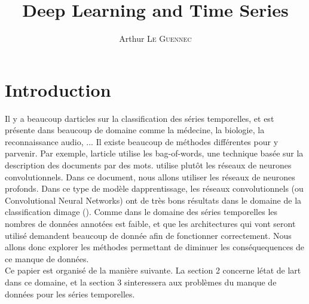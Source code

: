 \documentclass[11pt]{sdm}
\title{Deep Learning and Time Series}
\author{Arthur \textsc{Le Guennec}}
\begin{document}
\maketitle


\section{Introduction}

Il y a beaucoup d\textquotesingle articles sur la classification des s\'eries temporelles, et est pr\'esente dans beaucoup de domaine comme la m\'edecine, la biologie, la reconnaissance audio, ... Il existe beaucoup de m\'ethodes diff\'erentes pour y parvenir. Par exemple, l\textquotesingle article \cite{bailly2015bag} utilise les bag-of-words, une technique bas\'ee sur la description des documents par des mots. \cite{zheng2014time} utilise plut\^ot les r\'eseaux de neurones convolutionnels.
Dans ce document, nous allons utiliser les r\'eseaux de neurones profonds. Dans ce type de mod\`ele d\textquotesingle apprentissage, les r\'eseaux convolutionnels (ou Convolutional Neural Networks) ont de tr\`es bons r\'esultats dans le domaine de la classification d\textquotesingle image (\cite{chatfield2014return}).
Comme dans le domaine des s\'eries temporelles les nombres de donn\'ees annot\'ees est faible, et que les architectures qui vont seront utilis\'e demandent beaucoup de donn\'ee afin de fonctionner correctement. Nous allons donc explorer les m\'ethodes permettant de diminuer les cons\'equequences de ce manque de donn\'ees. \\
Ce papier est organis\'e de la mani\`ere suivante. La section 2 concerne l\textquotesingle \'etat de l\textquotesingle art dans ce domaine, et la section 3 s\textquotesingle interessera aux probl\`emes du manque de donn\'ees pour les s\'eries temporelles.

 
\end{document}
